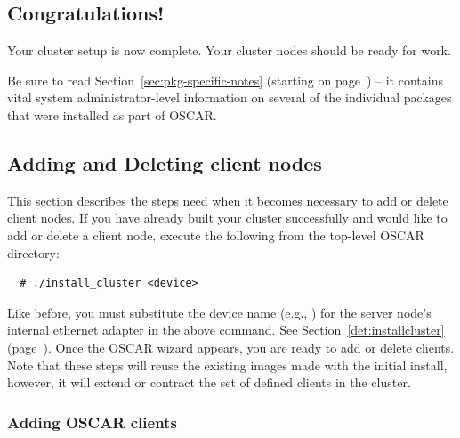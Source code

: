 
\subsection{Congratulations!}

Your cluster setup is now complete. Your cluster nodes should
be ready for work.

Be sure to read Section~\ref{sec:pkg-specific-notes} (starting on
page~\pageref{sec:pkg-specific-notes}) -- it contains vital system
administrator-level information on several of the individual packages
that were installed as part of OSCAR.


\subsection{Adding and Deleting client nodes}

This section describes the steps need when it becomes necessary to add
or delete client nodes. If you have already built your cluster
successfully and would like to add or delete a client node, execute
the following from the top-level OSCAR directory:

\begin{verbatim}
  # ./install_cluster <device>
\end{verbatim}

Like before, you must substitute the device name (e.g., )
for the server node's internal ethernet adapter in the above command.
See Section~\ref{det:installcluster}
(page~\pageref{det:installcluster}). Once the OSCAR wizard appears,
you are ready to add or delete clients. Note that these steps will
reuse the existing images made with the initial install, however, it
will extend or contract the set of defined clients in the cluster.


\subsubsection{Adding OSCAR clients}
\label{det:adding-clients}

